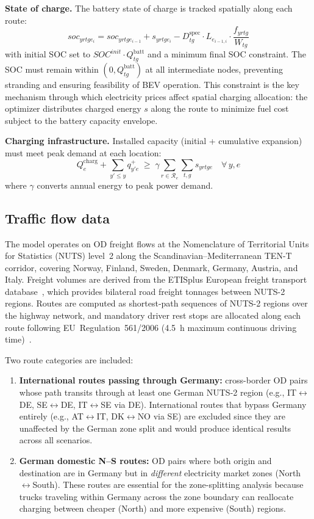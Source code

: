 \documentclass[conference]{IEEEtran}
\begin{document}
\textbf{State of charge.} The battery state of charge is tracked spatially along each route:
\begin{equation}
    soc_{yrtge_{i}} = soc_{yrtge_{i-1}} + s_{yrtge_{i}} - D^{\mathrm{spec}}_{tg} \cdot L_{e_{i-1,i}} \cdot \frac{f_{yrtg}}{W_{tg}}
\end{equation}
with initial SOC set to $SOC^{init} \cdot Q^{\mathrm{batt}}_{tg}$ and a minimum final SOC constraint. The SOC must remain within $(0, Q^{\mathrm{batt}}_{tg})$ at all intermediate nodes, preventing stranding and ensuring feasibility of BEV operation. This constraint is the key mechanism through which electricity prices affect spatial charging allocation: the optimizer distributes charged energy $s$ along the route to minimize fuel cost subject to the battery capacity envelope.

\textbf{Charging infrastructure.} Installed capacity (initial + cumulative expansion) must meet peak demand at each location:
\begin{equation}
    Q^{\mathrm{charg}}_{e} + \sum_{y' \leq y} q^+_{y'e} \;\geq\; \gamma \sum_{r \in \mathcal{R}_e} \sum_{t,g} s_{yrtge} \quad \forall\, y, e
\end{equation}
where $\gamma$ converts annual energy to peak power demand.

\subsection{Traffic flow data}

The model operates on OD freight flows at the Nomenclature of Territorial Units for Statistics (NUTS) level~2 along the Scandinavian--Mediterranean TEN-T corridor, covering Norway, Finland, Sweden, Denmark, Germany, Austria, and Italy. Freight volumes are derived from the ETISplus European freight transport database~\cite{b_speth2021}, which provides bilateral road freight tonnages between NUTS-2 regions. Routes are computed as shortest-path sequences of NUTS-2 regions over the highway network, and mandatory driver rest stops are allocated along each route following EU~Regulation~561/2006 (4.5~h maximum continuous driving time)~\cite{b_transcomp}.

Two route categories are included:
\begin{enumerate}
    \item \textbf{International routes passing through Germany:} cross-border OD pairs whose path transits through at least one German NUTS-2 region (e.g., IT$\leftrightarrow$DE, SE$\leftrightarrow$DE, IT$\leftrightarrow$SE via DE). International routes that bypass Germany entirely (e.g., AT$\leftrightarrow$IT, DK$\leftrightarrow$NO via SE) are excluded since they are unaffected by the German zone split and would produce identical results across all scenarios.
    \item \textbf{German domestic N--S routes:} OD pairs where both origin and destination are in Germany but in \emph{different} electricity market zones (North$\leftrightarrow$South). These routes are essential for the zone-splitting analysis because trucks traveling within Germany across the zone boundary can reallocate charging between cheaper (North) and more expensive (South) regions.
\end{enumerate}
\end{document}

